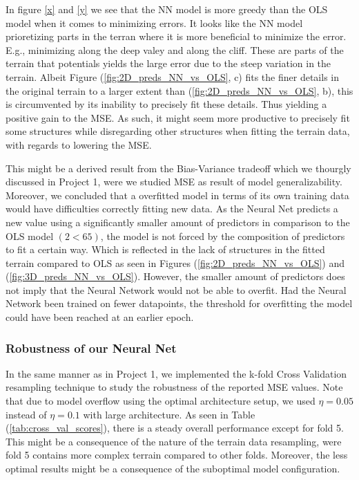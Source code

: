 \documentclass
[twocolumn,
secnumarabic,
nobibnotes,
aps,
prl,
reprint,
groupedaddress,
amsmath,
amssymb
]{revtex4-2}
\begin{document}
In figure \ref{x} and \ref{y} we see that the NN model is more greedy than the OLS model when it comes to minimizing errors. It looks like the NN model prioretizing parts in the terran
where it is more beneficial to minimize the error. E.g., minimizing along the deep valey and along the cliff. These are parts of the terrain that potentials yields the large error due to the steep
variation in the terrain. Albeit Figure (\ref{fig:2D_preds_NN_vs_OLS}, c) fits the finer details in the original terrain to a larger extent than (\ref{fig:2D_preds_NN_vs_OLS}, b), this is circumvented by its inability to precisely fit these details. Thus yielding a positive gain to the MSE. As such, it might seem more productive to precisely fit some structures while disregarding other structures when fitting the terrain data, with regards to lowering the MSE.

This might be a derived result from the Bias-Variance tradeoff which we thourgly discussed in Project 1, were we studied MSE as result of model generalizability. Moreover, we concluded that a overfitted model in terms of its own training data would have difficulties correctly fitting new data. As the Neural Net predicts a new value using a significantly smaller amount of predictors in comparison to the OLS model $(2 < 65)$, the model is not forced by the composition of predictors to fit a certain way. Which is reflected in the lack of structures in the fitted terrain compared to OLS as seen in Figures (\ref{fig:2D_preds_NN_vs_OLS}) and (\ref{fig:3D_preds_NN_vs_OLS}). However, the smaller amount of predictors does not imply that the Neural Network would not be able to overfit. Had the Neural Network been trained on fewer datapoints, the threshold for overfitting the model could have been reached at an earlier epoch.


\subsubsection{Robustness of our Neural Net}
In the same manner as in Project 1, we implemented the k-fold Cross Validation resampling technique to study the robustness of the reported MSE values. Note that due to model overflow using the optimal architecture setup, we used $\eta = 0.05$ instead of $\eta = 0.1$ with large architecture. As seen in Table (\ref{tab:cross_val_scores}), there is a steady overall performance except for fold 5. This might be a consequence of the nature of the terrain data resampling, were fold 5 contains more complex terrain compared to other folds. Moreover, the less optimal results might be a consequence of the suboptimal model configuration.
\end{document}
